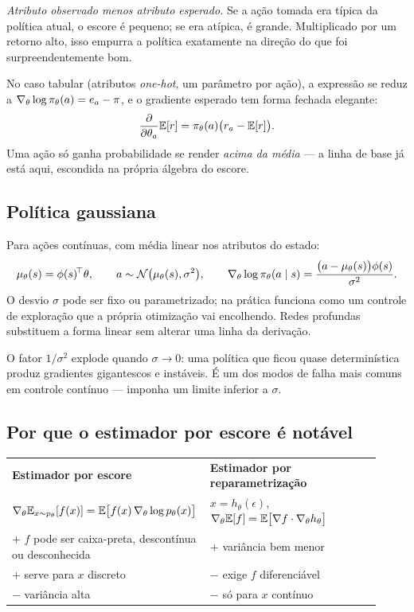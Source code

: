 \documentclass[11pt]{article}
\newcommand{\thv}{\theta}
\newcommand{\polth}{\pol_{\thv}}
\newcommand{\gth}{\nabla_{\thv}}
\newcommand{\feat}{\phi}
\newcommand{\gscore}{\gth \log \polth(a \mid s)}
\begin{document}
\begin{ideiabox}
\emph{Atributo observado menos atributo esperado.} Se a ação tomada era típica
da política atual, o escore é pequeno; se era atípica, é grande. Multiplicado por
um retorno alto, isso empurra a política exatamente na direção do que foi
surpreendentemente bom.
\end{ideiabox}

No caso tabular (atributos \emph{one-hot}, um parâmetro por ação), a expressão
se reduz a $\gth\log\polth(a) = e_a - \pol$, e o gradiente esperado tem forma
fechada elegante:
\begin{equation}\label{eq:bandido}
  \frac{\partial}{\partial\thv_a}\E[r] = \polth(a)\bigl(r_a - \E[r]\bigr).
\end{equation}
Uma ação só ganha probabilidade se render \emph{acima da média} --- a linha de
base já está aqui, escondida na própria álgebra do escore.

\subsection{Política gaussiana}

Para ações contínuas, com média linear nos atributos do estado:
\[
  \mu_{\thv}(s) = \feat(s)^{\!\top}\thv,
  \qquad a \sim \mathcal{N}\bigl(\mu_{\thv}(s),\sigma^2\bigr),
  \qquad
  \gscore = \frac{\bigl(a-\mu_{\thv}(s)\bigr)\feat(s)}{\sigma^2}.
\]
O desvio $\sigma$ pode ser fixo ou parametrizado; na prática funciona como um
controle de exploração que a própria otimização vai encolhendo. Redes profundas
substituem a forma linear sem alterar uma linha da derivação.

\begin{alertabox}
O fator $1/\sigma^2$ explode quando $\sigma\to 0$: uma política que ficou quase
determinística produz gradientes gigantescos e instáveis. É um dos modos de falha
mais comuns em controle contínuo --- imponha um limite inferior a $\sigma$.
\end{alertabox}

\subsection{Por que o estimador por escore é notável}

\begin{center}
\small
\begin{tabular}{@{}p{0.46\linewidth}p{0.46\linewidth}@{}}
\toprule
\textbf{Estimador por escore} & \textbf{Estimador por reparametrização}\\
$\gth\E_{x\sim p_{\thv}}[f(x)] = \E\bigl[f(x)\,\gth\log p_{\thv}(x)\bigr]$
 & $x = h_{\thv}(\epsilon)$, \ $\gth\E[f] = \E\bigl[\nabla f\cdot \gth h_{\thv}\bigr]$\\
\midrule
$+$ $f$ pode ser caixa-preta, descontínua ou desconhecida
 & $+$ variância bem menor\\
$+$ serve para $x$ discreto
 & $-$ exige $f$ diferenciável\\
$-$ variância alta
 & $-$ só para $x$ contínuo\\
\bottomrule
\end{tabular}
\end{center}
\end{document}
